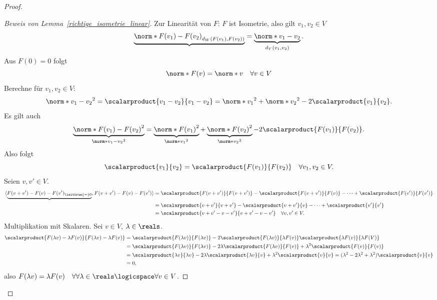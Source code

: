 \begin{proof}
\begin{proof}[Beweis von Lemma~\ref{richtige_isometrie_linear}]
    Zur Linearität von \( F \): \( F \) ist Isometrie, also gilt \tforall \( v_1,v_2\in V \)
    \begin{equation*}
      \underbrace{\norm*{F(v_1)-F(v_2)}_{d_W(F(v_1),F(v_2))}}=\underbrace{\norm*{v_1-v_2}}_{d_V(v_1,v_2)}.
    \end{equation*}
    Aus \( F(0)=0 \) folgt
    \begin{equation*}
      \norm*{F(v)}=\norm*{v}\quad \forall v\in V
    \end{equation*}
    Berechne für \( v_1,v_2\in V \):
    \begin{equation*}
      \norm*{v_1-v_2}^2=\scalarproduct{v_1-v_2}{v_1-v_2}=\norm*{v_1}^2+\norm*{v_2}^2-2\scalarproduct{v_1}{v_2}.
    \end{equation*}
    Es gilt auch
    \begin{equation*}
      \underbrace{\norm*{F(v_1)-F(v_2)}^2}_{\norm*{v_1-v_2}^2}=\underbrace{\norm*{F(v_1)}^2}_{\norm*{v_1}^2}+\underbrace{\norm*{F(v_2)}^2}_{\norm*{v_2}^2}-2\scalarproduct{F(v_1)}{F(v_2)}.
    \end{equation*}
    Also folgt
    \begin{equation*}
      \scalarproduct{v_1}{v_2}=\scalarproduct{F(v_1)}{F(v_2)}\quad \forall v_1,v_2\in V.
    \end{equation*}
    Seien \( v,v'\in V \).
    \begin{align*}
      \langle \underbrace{F(v+v')-F(v)-F(v')_{\isittrue{=}0}},F(v+v')-F(v)-F(v')\rangle&=\scalarproduct{F(v+v')}{F(v+v')}-\scalarproduct{F(v+v')}{F(v)}-\dotsb+\scalarproduct{F(v')}{F(v')}\\
      &=\scalarproduct{v+v'}{v+v'}-\scalarproduct{v+v'}{v}-\dotsb+\scalarproduct{v'}{v'}\\
      &=\scalarproduct{v+v'-v-v'}{v+v'-v-v'} \quad \forall v,v'\in V.
    \end{align*}
    Multiplikation mit Skalaren. Sei \( v\in V \), \( \lambda\in \reals \).
    \begin{align*}
      \scalarproduct{F(\lambda v)-\lambda F(v)}{F(\lambda v)-\lambda F(v)}&=\scalarproduct{F(\lambda v)}{F(\lambda v)}-2\scalarproduct{F(\lambda v)}{\lambda F(v)}\scalarproduct{\lambda F(v)}{\lambda F(V)}\\
      &=\scalarproduct{F(\lambda v)}{F(\lambda v)}-2\lambda \scalarproduct{F(\lambda v)}{F(v)}+\lambda^2\scalarproduct{F(v)}{F(v)}\\
      &=\scalarproduct{\lambda v}{\lambda v}-2\lambda \scalarproduct{\lambda v}{v}+\lambda^2\scalarproduct{v}{v}=(\lambda^2-2\lambda^2+\lambda^2)\scalarproduct{v}{v}\\
      &=0,
    \end{align*}
    also \( F(\lambda v)=\lambda F(v)\quad  \forall \forall \lambda\in\reals\logicspace \forall v\in V \).
  \end{proof}
\end{proof}
